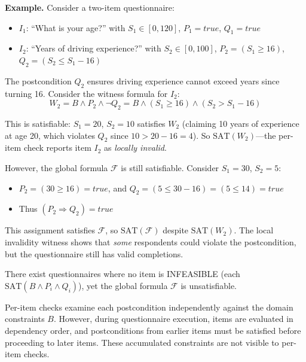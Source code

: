 \begin{mdframed}
\noindent\textbf{Example.} Consider a two-item questionnaire:
\begin{itemize}
    \item $I_1$: ``What is your age?'' with $S_1 \in [0, 120]$, $P_1 = \mathit{true}$, $Q_1 = \mathit{true}$
    \item $I_2$: ``Years of driving experience?'' with $S_2 \in [0, 100]$, $P_2 = (S_1 \geq 16)$, $Q_2 = (S_2 \leq S_1 - 16)$
\end{itemize}

The postcondition $Q_2$ ensures driving experience cannot exceed years since turning 16. Consider the witness formula for $I_2$:
\[
W_2 = B \wedge P_2 \wedge \lnot Q_2 = B \wedge (S_1 \geq 16) \wedge (S_2 > S_1 - 16)
\]

This is satisfiable: $S_1 = 20$, $S_2 = 10$ satisfies $W_2$ (claiming 10 years of experience at age 20, which violates $Q_2$ since $10 > 20 - 16 = 4$). So $\mathrm{SAT}(W_2)$—the per-item check reports item $I_2$ as \emph{locally invalid}.

However, the global formula $\mathcal{F}$ is still satisfiable. Consider $S_1 = 30$, $S_2 = 5$:
\begin{itemize}
    \item $P_2 = (30 \geq 16) = \mathit{true}$, and $Q_2 = (5 \leq 30 - 16) = (5 \leq 14) = \mathit{true}$
    \item Thus $(P_2 \Rightarrow Q_2) = \mathit{true}$
\end{itemize}

This assignment satisfies $\mathcal{F}$, so $\mathrm{SAT}(\mathcal{F})$ despite $\mathrm{SAT}(W_2)$. The local invalidity witness shows that \emph{some} respondents could violate the postcondition, but the questionnaire still has valid completions.
\end{mdframed}

\begin{theorem}
\label{thm:accumulated-unsat}
There exist questionnaires where no item is INFEASIBLE (each $\mathrm{SAT}(B \wedge P_i \wedge Q_i)$), yet the global formula $\mathcal{F}$ is unsatisfiable.
\end{theorem}

Per-item checks examine each postcondition independently against the domain constraints $B$. However, during questionnaire execution, items are evaluated in dependency order, and postconditions from earlier items must be satisfied before proceeding to later items. These accumulated constraints are not visible to per-item checks.

